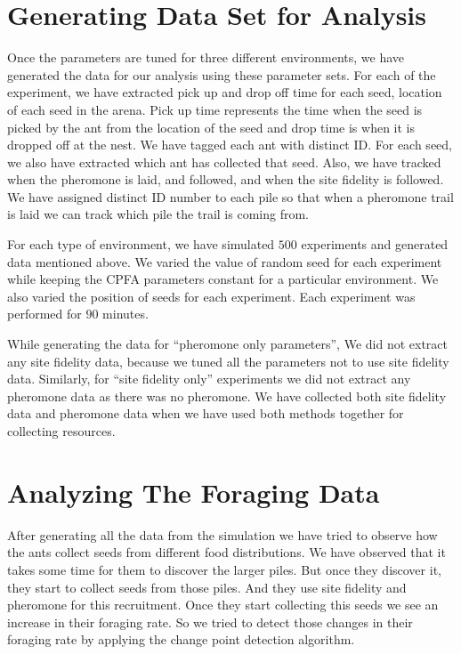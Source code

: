 \section{\label{section:Generating Data Set for Analysis}Generating Data Set for Analysis}
 Once the parameters are tuned for three different environments, we have generated the data for our analysis using these parameter sets. For each of the experiment, we have extracted pick up and drop off time for each seed, location of each seed in the arena. Pick up time represents the time when the seed is picked by the ant from the location of the seed and drop time is when it is dropped off at the nest. We have tagged each ant with distinct ID. For each seed, we also have extracted which ant has collected that seed. Also, we have tracked when the pheromone is laid, and followed, and when the site fidelity is followed. We have assigned distinct ID number to each pile so that when a pheromone trail is laid we can track which pile the trail is coming from.\par
 For each type of environment, we have simulated $500$ experiments and generated data mentioned above. We varied the value of random seed for each experiment while keeping the CPFA parameters constant for a particular environment. We also varied the position of seeds for each experiment. Each experiment was performed for $90$ minutes.\par 
 While generating the data for ``pheromone only parameters'', We did not extract any site fidelity data, because we tuned all the parameters not to use site fidelity data. Similarly, for ``site fidelity only'' experiments we did not extract any pheromone data as there was no pheromone. We have collected both site fidelity data and pheromone data when we have used both methods together for collecting resources.
 \section{\label{Analyzing The Foraging Data}Analyzing The Foraging Data}
 After generating all the data from the simulation we have tried to observe how the ants collect seeds from different food distributions. We have observed that it takes some time for them to discover the larger piles. But once they discover it, they start to collect seeds from those piles. And they use site fidelity and pheromone for this recruitment. Once they start collecting this seeds we see an increase in their foraging rate. So we tried to detect those changes in their foraging rate by applying the change point detection algorithm. 
